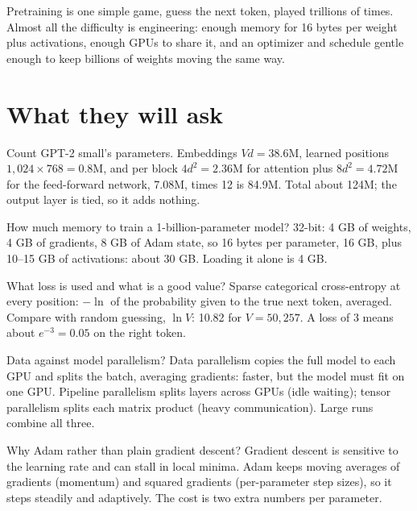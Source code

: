 \begin{intuition}
Pretraining is one simple game, guess the next token, played trillions of times. Almost all the difficulty is engineering: enough memory for 16 bytes per weight plus activations, enough GPUs to share it, and an optimizer and schedule gentle enough to keep billions of weights moving the same way.
\end{intuition}

\section{What they will ask}

\begin{iq}[\core]{Count GPT-2 small's parameters.}
Embeddings $Vd = 38.6$M, learned positions $1{,}024 \times 768 = 0.8$M, and per block $4d^2 = 2.36$M for attention plus $8d^2 = 4.72$M for the feed-forward network, 7.08M, times 12 is 84.9M. Total about 124M; the output layer is tied, so it adds nothing.
\end{iq}

\begin{iq}[\core]{How much memory to train a 1-billion-parameter model?}
32-bit: 4 GB of weights, 4 GB of gradients, 8 GB of Adam state, so 16 bytes per parameter, 16 GB, plus 10--15 GB of activations: about 30 GB. Loading it alone is 4 GB.
\end{iq}

\begin{iq}[\core]{What loss is used and what is a good value?}
Sparse categorical cross-entropy at every position: $-\ln$ of the probability given to the true next token, averaged. Compare with random guessing, $\ln V$: 10.82 for $V = 50{,}257$. A loss of 3 means about $e^{-3} = 0.05$ on the right token.
\end{iq}

\begin{iq}[\core]{Data against model parallelism?}
Data parallelism copies the full model to each GPU and splits the batch, averaging gradients: faster, but the model must fit on one GPU. Pipeline parallelism splits layers across GPUs (idle waiting); tensor parallelism splits each matrix product (heavy communication). Large runs combine all three.
\end{iq}

\begin{iq}[\core]{Why Adam rather than plain gradient descent?}
Gradient descent is sensitive to the learning rate and can stall in local minima. Adam keeps moving averages of gradients (momentum) and squared gradients (per-parameter step sizes), so it steps steadily and adaptively. The cost is two extra numbers per parameter.
\end{iq}

